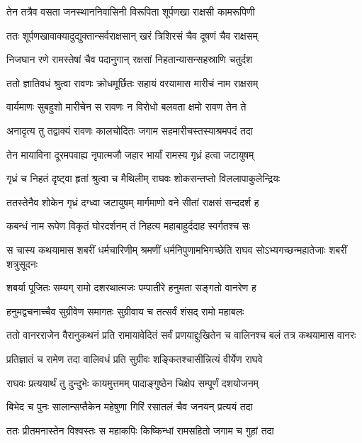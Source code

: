 \twolineshloka
{तेन तत्रैव वसता जनस्थाननिवासिनी}
{विरूपिता शूर्पणखा राक्षसी कामरूपिणी} %

\twolineshloka
{ततः शूर्पणखावाक्यादुद्युक्तान्सर्वराक्षसान्}
{खरं त्रिशिरसं चैव दूषणं चैव राक्षसम्} %

\twolineshloka
{निजघान रणे रामस्तेषां चैव पदानुगान्}
{रक्षसां निहतान्यासन्सहस्राणि चतुर्दश} %

\twolineshloka
{ततो ज्ञातिवधं श्रुत्वा रावणः क्रोधमूर्छितः}
{सहायं वरयामास मारीचं नाम राक्षसम्} %

\twolineshloka
{वार्यमाणः सुबहुशो मारीचेन स रावणः}
{न विरोधो बलवता क्षमो रावण तेन ते} %

\twolineshloka
{अनादृत्य तु तद्वाक्यं रावणः कालचोदितः}
{जगाम सहमारीचस्तस्याश्रमपदं तदा} %

\twolineshloka
{तेन मायाविना दूरमपवाह्य नृपात्मजौ}
{जहार भार्यां रामस्य गृध्रं हत्वा जटायुषम्} %

\twolineshloka
{गृध्रं च निहतं दृष्ट्वा हृतां श्रुत्वा च मैथिलीम्}
{राघवः शोकसन्तप्तो विललापाकुलेन्द्रियः} %

\twolineshloka
{ततस्तेनैव शोकेन गृध्रं दग्ध्वा जटायुषम्}
{मार्गमाणो वने सीतां राक्षसं सन्ददर्श ह} %

\twolineshloka
{कबन्धं नाम रूपेण विकृतं घोरदर्शनम्}
{तं निहत्य महाबाहुर्ददाह स्वर्गतश्च सः} %

\threelineshloka
{स चास्य कथयामास शबरीं धर्मचारिणीम्}
{श्रमणीं धर्मनिपुणामभिगच्छेति राघव}
{सोऽभ्यगच्छन्महातेजाः शबरीं शत्रुसूदनः} %

\twolineshloka
{शबर्या पूजितः सम्यग् रामो दशरथात्मजः}
{पम्पातीरे हनुमता सङ्गतो वानरेण ह} %

\twolineshloka
{हनुमद्वचनाच्चैव सुग्रीवेण समागतः}
{सुग्रीवाय च तत्सर्वं शंसद् रामो महाबलः} %

\threelineshloka
{ततो वानरराजेन वैरानुकथनं प्रति}
{रामायावेदितं सर्वं प्रणयाद्दुःखितेन च}
{वालिनश्च बलं तत्र कथयामास वानरः} %

\twolineshloka
{प्रतिज्ञातं च रामेण तदा वालिवधं प्रति}
{सुग्रीवः शङ्कितश्चासीन्नित्यं वीर्येण राघवे} %

\twolineshloka
{राघवः प्रत्ययार्थं तु दुन्दुभेः कायमुत्तमम्}
{पादाङ्गुष्ठेन चिक्षेप सम्पूर्णं दशयोजनम्} %

\twolineshloka
{बिभेद च पुनः सालान्सप्तैकेन महेषुणा}
{गिरिं रसातलं चैव जनयन् प्रत्ययं तदा} %

\twolineshloka
{ततः प्रीतमनास्तेन विश्वस्तः स महाकपिः}
{किष्किन्धां रामसहितो जगाम च गुहां तदा} %

